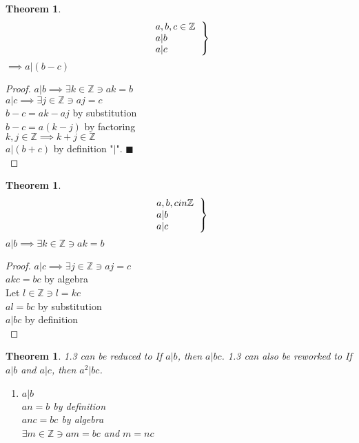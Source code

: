 \documentclass{article}
\newtheorem{theorem}[section]{Theorem}
\begin{document}
	\begin{theorem}
		\[ \left .
		\begin{tabular}{l}
			$a,b,c \in \mathbb{Z}$\\
			$a | b$\\
			$a | c$\\
		\end{tabular}
	\right \}\]
	$\implies a|(b-c)$\\ 
	\end{theorem}\begin{proof} $a|b \implies \exists k \in \mathbb{Z} \ni ak = b$\\
	$a|c \implies \exists j \in \mathbb{Z} \ni aj = c$\\
	$b-c=ak-aj$ by substitution\\
	$b-c=a(k-j)$ by factoring\\
	$k,j \in \mathbb{Z} \implies k+j \in \mathbb{Z}$\\
	$a|(b+c)$ by definition "$|$". $\blacksquare$ \\
\end{proof}\begin{theorem}
		\[ \left .
		\begin{tabular}{l}
			$a,b,c in \mathbb{Z}$\\
			$a|b$\\
			$a|c$\\
		\end{tabular}
		\right \}
		\]
		$a|b \implies \exists k \in \mathbb{Z} \ni ak = b$\\
	\end{theorem}\begin{proof}
	$a|c \implies \exists j \in \mathbb{Z} \ni aj = c$\\
	$akc = bc$ by algebra\\
	Let $l \in \mathbb{Z} \ni l=kc$\\
	$al = bc$ by substitution\\
	$a|bc$ by definition\\
\end{proof}\begin{theorem}%
\emph{1.3} can be reduced to \emph{If $a|b$, then $a|bc$.} \emph{1.3} can also be reworked to \emph{If $a|b$ and $a|c$, then $a^2|bc$.}
	\begin{enumerate}
		\item
			$a|b$\\
			$an=b$ by definition\\
			$anc=bc$ by algebra\\
			$\exists m \in \mathbb{Z} \ni am=bc$ and $m=nc$\\

\end{enumerate}
\end{theorem}
\end{document}

